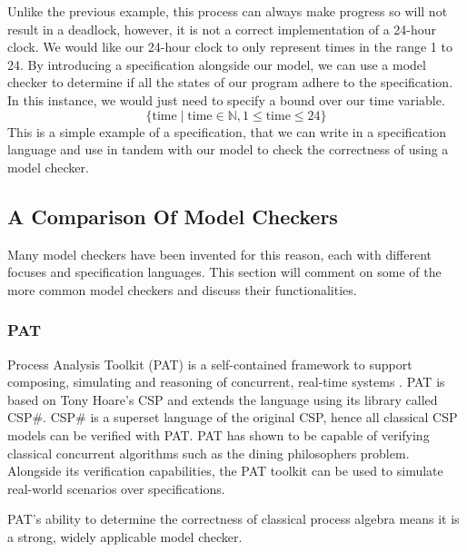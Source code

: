 Unlike the previous example, this process can always make progress so will not result in a deadlock, however, it is not a correct implementation of a 24-hour clock. We would like our 24-hour clock to only represent times in the range 1 to 24. By introducing a specification alongside our model, we can use a model checker to determine if all the states of our program adhere to the specification. In this instance, we would just need to specify a bound over our time variable.
\[
\{ \text{time} \mid \text{time} \in \mathbb{N}, 1 \leq \text{time} \leq 24 \}
\]
This is a simple example of a specification, that we can write in a specification language and use in tandem with our model to check the correctness of using a model checker.
\subsection[]{A Comparison Of Model Checkers}
Many model checkers have been invented for this reason, each with different focuses and specification languages. This section will comment on some of the more common model checkers and discuss their functionalities. \\
\subsubsection*{\textbf{PAT}}
Process Analysis Toolkit (PAT) is a self-contained framework to support composing, simulating and reasoning of concurrent, real-time systems \cite{pat}. PAT is based on Tony Hoare's CSP and extends the language using its library called CSP\#. CSP\# is a superset language of the original CSP, hence all classical CSP models can be verified with PAT. PAT has shown to be capable of verifying classical concurrent algorithms such as the dining philosophers problem. Alongside its verification capabilities, the PAT toolkit can be used to simulate real-world scenarios over specifications. 
\par
PAT's ability to determine the correctness of classical process algebra means it is a strong, widely applicable model checker.

